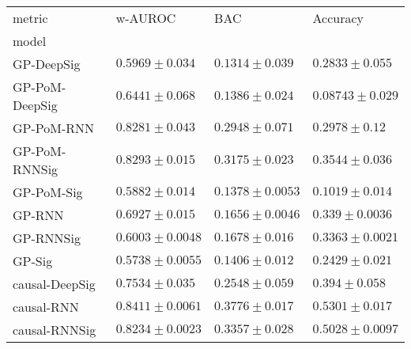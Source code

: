 \begin{tabular}{llll}
\toprule
metric &                                         w-AUROC &                                            BAC &                                       Accuracy \\
model          &                                                 &                                                &                                                \\
\midrule
GP-DeepSig     &                            $ 0.5969 \pm 0.034 $ &                           $ 0.1314 \pm 0.039 $ &                           $ 0.2833 \pm 0.055 $ \\
GP-PoM-DeepSig &                            $ 0.6441 \pm 0.068 $ &                           $ 0.1386 \pm 0.024 $ &                          $ 0.08743 \pm 0.029 $ \\
GP-PoM-RNN     &                            $ 0.8281 \pm 0.043 $ &                           $ 0.2948 \pm 0.071 $ &                            $ 0.2978 \pm 0.12 $ \\
GP-PoM-RNNSig  &                            $ 0.8293 \pm 0.015 $ &                           $ 0.3175 \pm 0.023 $ &                           $ 0.3544 \pm 0.036 $ \\
GP-PoM-Sig     &                            $ 0.5882 \pm 0.014 $ &                          $ 0.1378 \pm 0.0053 $ &                           $ 0.1019 \pm 0.014 $ \\
GP-RNN         &                            $ 0.6927 \pm 0.015 $ &                          $ 0.1656 \pm 0.0046 $ &                           $ 0.339 \pm 0.0036 $ \\
GP-RNNSig      &                           $ 0.6003 \pm 0.0048 $ &                           $ 0.1678 \pm 0.016 $ &                          $ 0.3363 \pm 0.0021 $ \\
GP-Sig         &                           $ 0.5738 \pm 0.0055 $ &                           $ 0.1406 \pm 0.012 $ &                           $ 0.2429 \pm 0.021 $ \\
causal-DeepSig &                            $ 0.7534 \pm 0.035 $ &                           $ 0.2548 \pm 0.059 $ &                            $ 0.394 \pm 0.058 $ \\
causal-RNN     &                           $ 0.8411 \pm 0.0061 $ &                           $ 0.3776 \pm 0.017 $ &                           $ 0.5301 \pm 0.017 $ \\
causal-RNNSig  &                           $ 0.8234 \pm 0.0023 $ &                           $ 0.3357 \pm 0.028 $ &                          $ 0.5028 \pm 0.0097 $ \\

\end{tabular}
